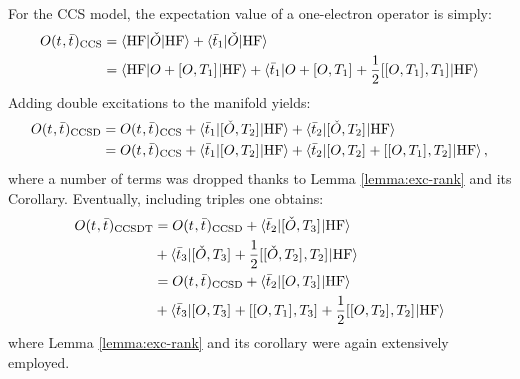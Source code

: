 For the \acrshort{CCS} model, the expectation value of a one-electron operator
is simply:
\begin{equation}\label{eq:ccs-expectation-value}
\begin{aligned}
  O(t_{}, \bar{t}_{})_\mathrm{CCS} &=
  \braket{\mathrm{HF} | \check{O} | \mathrm{HF} }
  + \braket{\bar{t}_{1} | \check{O} | \mathrm{HF} } \\
  &=
  \braket{\mathrm{HF} | O + [ O, T_1 ]^{} | \mathrm{HF} }
  + \braket{\bar{t}_{1} | O + [ O, T_1 ]^{}
  + \frac{1}{2}[ [ O, T_1 ]^{}, T_1 ]^{} | \mathrm{HF} }
\end{aligned}
\end{equation}
Adding double excitations to the manifold yields:
\begin{equation}\label{eq:ccsd-expectation-value}
  \begin{aligned}
  O(t_{}, \bar{t}_{})_\mathrm{CCSD}
  &=
    O(t_{}, \bar{t}_{})_\mathrm{CCS}
  + \braket{\bar{t}_{1} | [ \check{O}, T_2 ]^{} | \mathrm{HF} }
  + \braket{\bar{t}_{2} | [ \check{O}, T_2 ]^{} | \mathrm{HF} } \\
  &=
    O(t_{}, \bar{t}_{})_\mathrm{CCS}
  + \braket{\bar{t}_{1} | [ O, T_2 ]^{} | \mathrm{HF} }
  + \braket{\bar{t}_{2} | [ O, T_2 ]^{}
      + [ [ O, T_1 ]^{}, T_2 ]^{}
  | \mathrm{HF} },
  \end{aligned}
\end{equation}
where a number of terms was dropped thanks to Lemma \ref{lemma:exc-rank} and its
Corollary.
Eventually, including triples one obtains:
\begin{equation}\label{eq:ccsdt-expectation-value}
\begin{aligned}
  O(t_{}, \bar{t}_{})_\mathrm{CCSDT}
  &=
    O(t_{}, \bar{t}_{})_\mathrm{CCSD}
  + \braket{\bar{t}_{2} | [ \check{O}, T_3 ]^{} | \mathrm{HF} } \\
  &+ \braket{\bar{t}_{3} | [ \check{O}, T_3 ]^{}
    + \frac{1}{2}[ [ \check{O}, T_2 ]^{}, T_2 ]^{}
  | \mathrm{HF} } \\
  &=
    O(t_{}, \bar{t}_{})_\mathrm{CCSD}
  + \braket{\bar{t}_{2} | [ O, T_3 ]^{} | \mathrm{HF} } \\
  &+ \braket{\bar{t}_{3} | [ O, T_3 ]^{}
    + [ [ O, T_1 ]^{}, T_3 ]^{}
    + \frac{1}{2}[ [ O, T_2 ]^{}, T_2 ]^{}
  | \mathrm{HF} }
\end{aligned}
\end{equation}
where Lemma \ref{lemma:exc-rank} and its corollary were again extensively employed.

